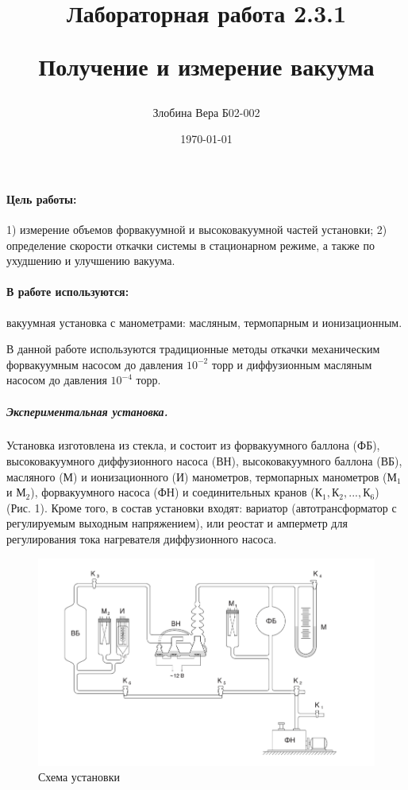 \documentclass[a4paper,12pt]{article}
\author{Злобина Вера Б02-002}
\title{Лабораторная работа 2.3.1
	
Получение и измерение вакуума}
\date{\today}
\begin{document}
\maketitle

\newpage

\paragraph{Цель работы:} 1) измерение объемов форвакуумной и высоковакуумной частей установки; 2) определение скорости откачки системы в стационарном режиме, а также по ухудшению и улучшению вакуума.
\paragraph{В работе используются:} вакуумная установка с манометрами: масляным, термопарным и ионизационным.




В данной работе используются традиционные методы откачки механическим форвакуумным насосом до давления $10^{-2}$ торр и диффузионным масляным насосом до давления $10^{-4}$ торр. 


\subparagraph*{Экспериментальная установка.} 
 	Установка изготовлена из стекла,
 и состоит из форвакуумного баллона (ФБ), высоковакуумного диффузионного насоса (ВН), высоковакуумного баллона (ВБ), масляного (М) и ионизационного (И) манометров, термопарных манометров ($\text{М}_1$ и $\text{М}_2$), форвакуумного насоса (ФН) и соединительных кранов ($К_1, К_2,..., К_6$) (Рис. 1). Кроме того, в состав установки входят: вариатор (автотрансформатор с регулируемым выходным напряжением), или реостат и амперметр для регулирования тока нагревателя диффузионного насоса. \\
  \begin{figure}[h]
 	\centering
 	\includegraphics[width=0.7 \textheight]{1.jpg}
 	\caption{Схема установки}
 	\label{fig:Схема установки}
 \end{figure}
\end{document}
